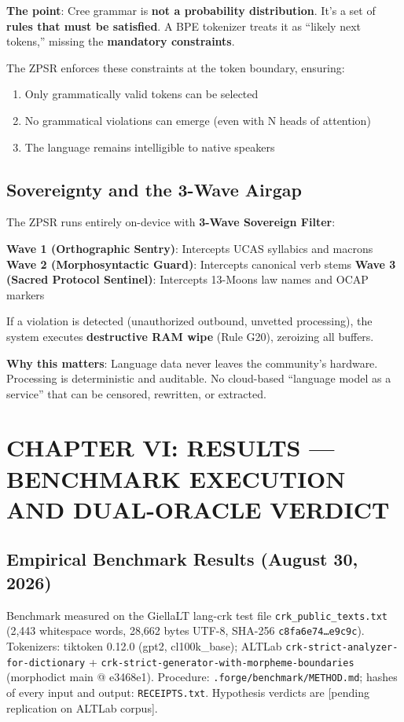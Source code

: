 \documentclass[11pt,oneside]{article}
\begin{document}
\textbf{The point}: Cree grammar is \textbf{not a probability distribution}. It's a set of \textbf{rules that must be satisfied}. A BPE tokenizer treats it as ``likely next tokens,'' missing the \textbf{mandatory constraints}.

The ZPSR enforces these constraints at the token boundary, ensuring:
\begin{enumerate}
  \item Only grammatically valid tokens can be selected
  \item No grammatical violations can emerge (even with N heads of attention)
  \item The language remains intelligible to native speakers
\end{enumerate}

\subsection{Sovereignty and the 3-Wave Airgap}

The ZPSR runs entirely on-device with \textbf{3-Wave Sovereign Filter}:

\textbf{Wave 1 (Orthographic Sentry)}: Intercepts UCAS syllabics and macrons
\textbf{Wave 2 (Morphosyntactic Guard)}: Intercepts canonical verb stems
\textbf{Wave 3 (Sacred Protocol Sentinel)}: Intercepts 13-Moons law names and OCAP markers

If a violation is detected (unauthorized outbound, unvetted processing), the system executes \textbf{destructive RAM wipe} (Rule G20), zeroizing all buffers.

\textbf{Why this matters}: Language data never leaves the community's hardware. Processing is deterministic and auditable. No cloud-based ``language model as a service'' that can be censored, rewritten, or extracted.

\section{CHAPTER VI: RESULTS --- BENCHMARK EXECUTION AND DUAL-ORACLE VERDICT}

\subsection{Empirical Benchmark Results (August 30, 2026)}

Benchmark measured on the GiellaLT lang-crk test file \texttt{crk\_public\_texts.txt} (2,443 whitespace words, 28,662 bytes UTF-8, SHA-256 \texttt{c8fa6e74\ldots e9c9c}). Tokenizers: tiktoken 0.12.0 (gpt2, cl100k\_base); ALTLab \texttt{crk-strict-analyzer-for-dictionary} + \texttt{crk-strict-generator-with-morpheme-boundaries} (morphodict main @ e3468e1). Procedure: \texttt{.forge/benchmark/METHOD.md}; hashes of every input and output: \texttt{RECEIPTS.txt}. Hypothesis verdicts are [pending replication on ALTLab corpus].
\end{document}

